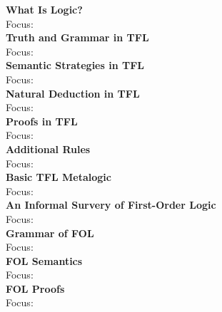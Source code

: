 \newpage
\begin{outline}[enumerate]

\1 \textbf{What Is Logic?} \\
Focus: \\
\2 \cite[Chapters 1-5 (pp. 2-48)]{Mag25}
\2 \cite[Chapters 1-4,6-7,11 (pp. 1-39,44-58,94-104)]{Smi20}
\1 \textbf{Truth and Grammar in TFL} \\
Focus: \\
\2 \cite[Chapters 6-11 (pp. 49-84)]{Mag25}
\2 \cite[Chapters 8-13,18-19 (pp. 59-120,148-172)]{Smi20} 
\1 \textbf{Semantic Strategies in TFL} \\
Focus: \\
\2 \cite[Chapters 12-15 (pp. 85-108)]{Mag25} 
\2 \cite[Chapters 14-16 (pp. 120-137)]{Smi20} 
\1 \textbf{Natural Deduction in TFL} \\
Focus: \\
\2 \cite[Chapter 16-17 (pp. 110-141)]{Mag25} 
\2 \cite[Chapters 20-22 (pp. 172-211)]{Smi20} 
\1 \textbf{Proofs in TFL} \\
Focus: \\
\2 \cite[Chapter 18 (pp. 142-161)]{Mag25} 
\2 \cite[Chapter 17 (pp. 145-147)]{Smi20} 
\1 \textbf{Additional Rules} \\
Focus: \\
\2 \cite[Chapters 19-21 (pp. 162-181)]{Mag25} 
\2 \cite[Chapter 23 (pp. 211-215)]{Smi20} 
\1 \textbf{Basic TFL Metalogic} \\
Focus: \\
\2 \cite[Chapter 22 (pp. 182-188)]{Mag25} 
\2 \cite[Chapter 24 (pp. 216-228)]{Smi20} 
\1 \textbf{An Informal Survery of First-Order Logic} \\
Focus: \\
\2 \cite[Chapter 23-27 (pp. 190-242)]{Mag25} 
\2 \cite[Chapters 25-27,31 (pp. 228-258,293-298)]{Smi20} 
\1 \textbf{Grammar of FOL} \\
Focus: \\
\2 \cite[Chapter 28-29 (pp. 243-256)]{Mag25} 
\2 \cite[Chapters 28-30 (pp. 258-289)]{Smi20} 
\1 \textbf{FOL Semantics} \\
Focus: \\
\2 \cite[Chapter 30-35 (pp. 258-295)]{Mag25} 
\1 \textbf{FOL Proofs} \\
Focus: \\
\2 \cite[Chapters 36-41 (pp. 297-335)]{Mag25} 
\2 \cite[Chapters 32-42, Appendix (pp. 299-412)]{Smi20} 

\end{outline}

